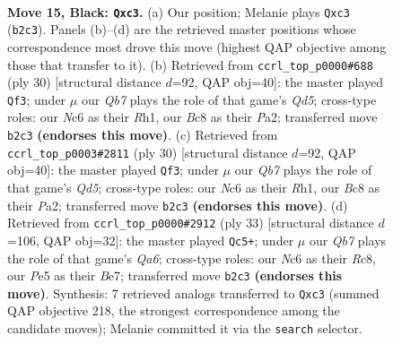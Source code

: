 \documentclass[11pt]{article}
\begin{document}
\clearpage

\begin{figure}[p]\centering
\begin{subfigure}{0.46\textwidth}\centering
\resizebox{\linewidth}{!}{%
\newchessgame
\chessboard[
  setfen={r1bk3r/pp3p1p/2n2N2/4p3/3p4/2RP1N2/Pq1Q1PPP/4K2R b K - 0 15},
  showmover=false,
  pgfstyle=straightmove, color=movearrow, markmove={b2-c3}
]}
\caption{}
\end{subfigure}\hfill
\begin{subfigure}{0.46\textwidth}\centering
\resizebox{\linewidth}{!}{%
\newchessgame
\chessboard[
  setfen={3rk2r/1p4pp/p4q2/n2Qp3/1b6/2N5/PPP1BPPP/R3K2R w KQk - 1 16},
  showmover=false,
  pgfstyle=straightmove, color=movearrow, markmove={d5-f3}
]}
\caption{}
\end{subfigure}
\\[4pt]
\begin{subfigure}{0.46\textwidth}\centering
\resizebox{\linewidth}{!}{%
\newchessgame
\chessboard[
  setfen={3rk2r/1p4pp/p4q2/n2Qp3/1b6/2N5/PPP1BPPP/R3K2R w KQk - 1 16},
  showmover=false,
  pgfstyle=straightmove, color=movearrow, markmove={d5-f3}
]}
\caption{}
\end{subfigure}\hfill
\begin{subfigure}{0.46\textwidth}\centering
\resizebox{\linewidth}{!}{%
\newchessgame
\chessboard[
  setfen={2r1k2r/1p2b1pp/p2p1n2/6B1/4P3/qRN5/P1PQ2PP/5RK1 b k - 0 17},
  showmover=false,
  pgfstyle=straightmove, color=movearrow, markmove={a3-c5}
]}
\caption{}
\end{subfigure}
\caption{\textbf{Move 15, Black: \texttt{Qxc3}.} (a) Our position; Melanie plays \texttt{Qxc3} (\texttt{b2c3}). Panels (b)--(d) are the retrieved master positions whose correspondence most drove this move (highest QAP objective among those that transfer to it). (b) Retrieved from \texttt{ccrl\_top\_p0000\#688} (ply 30) [structural distance $d$=92, QAP obj=40]: the master played \texttt{Qf3}; under $\mu$ our \emph{Qb7} plays the role of that game's \emph{Qd5}; cross-type roles: our \emph{N}c6 as their \emph{R}h1, our \emph{B}c8 as their \emph{P}a2; transferred move \texttt{b2c3} \textbf{(endorses this move)}. (c) Retrieved from \texttt{ccrl\_top\_p0003\#2811} (ply 30) [structural distance $d$=92, QAP obj=40]: the master played \texttt{Qf3}; under $\mu$ our \emph{Qb7} plays the role of that game's \emph{Qd5}; cross-type roles: our \emph{N}c6 as their \emph{R}h1, our \emph{B}c8 as their \emph{P}a2; transferred move \texttt{b2c3} \textbf{(endorses this move)}. (d) Retrieved from \texttt{ccrl\_top\_p0000\#2912} (ply 33) [structural distance $d$=106, QAP obj=32]: the master played \texttt{Qc5+}; under $\mu$ our \emph{Qb7} plays the role of that game's \emph{Qa6}; cross-type roles: our \emph{N}c6 as their \emph{R}c8, our \emph{P}e5 as their \emph{B}e7; transferred move \texttt{b2c3} \textbf{(endorses this move)}. Synthesis: 7 retrieved analogs transferred to \texttt{Qxc3} (summed QAP objective 218, the strongest correspondence among the candidate moves); Melanie committed it via the \texttt{search} selector.}
\label{fig:thought-m29}
\end{figure}
\end{document}
